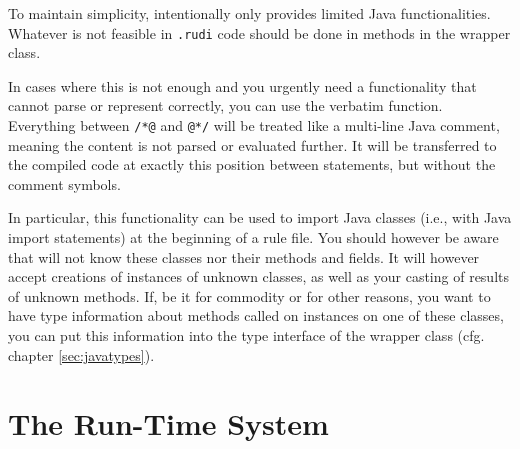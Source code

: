 %
To maintain simplicity, \vonda intentionally only provides limited Java functionalities. Whatever is not feasible in \texttt{.rudi} code should be done in methods in the wrapper class.%

%
In cases where this is not enough and you urgently need a functionality %
that \vonda cannot parse or represent correctly, you can use the verbatim function. Everything between \verb|/*@| and \verb|@*/| will be treated like a multi-line Java comment, meaning the content is not parsed or evaluated further. It will be transferred to the compiled code at exactly this position between statements, but without the comment symbols.


In particular, this functionality can be used to import Java classes (i.e., with Java import statements) at the beginning of a rule file. You should however be aware that \vonda will not know these classes nor their methods and fields. It will however accept creations of instances of unknown classes, as well as your casting of results of unknown methods. If, be it for commodity or for other reasons, you want \vonda to have type information about methods called on instances on one of these classes, you can put this information into the type interface of the wrapper class (cfg. chapter \ref{sec:javatypes}).

\section{The Run-Time System}

